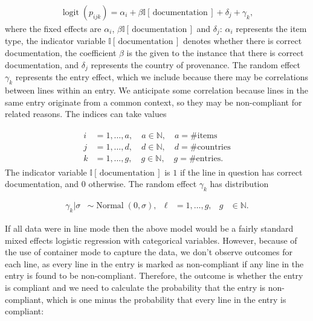 \documentclass[aoas]{imsart}
\DeclareMathOperator{\logit}{logit}
\DeclareMathOperator{\Normal}{Normal}
\begin{document}
\begin{align}
\logit(p_{ijk}) = \alpha_{i} + \beta\mathbb{I}[\,\text{documentation}\,] + \delta_j + \gamma_k \label{eq:logit_model_sim},
\end{align}
where the fixed effects are $\alpha_i$, $\beta\mathbb{I}[\,\text{documentation}\,]$ and $\delta_j$: $\alpha_i$ represents the item type, the indicator variable $\mathbb{I}[\,\text{documentation}\,]$ denotes whether there is correct documentation, the coefficient $\beta$ is the given to the instance that there is correct documentation, and $\delta_j$ represents the country of provenance. The random effect $\gamma_k$ represents the entry effect, which we include because there may be correlations between lines within an entry.  {We anticipate some correlation because lines in the same entry originate from a common context, so they may be non-compliant for related reasons}. The indices can take values

\begin{align}
\begin{split}
i &=1, \ldots, a,\quad  a\in \mathbb{N},\quad a = \text{\# items}\\
j &= 1,\ldots, d, \quad d \in \mathbb{N},\quad d = \text{\# countries}\\
k &= 1,\ldots,g, \quad g\in \mathbb{N},\quad g = \text{\# entries}.
\end{split}
\end{align}
The indicator variable $\mathbb{I}[\,\text{documentation}\,]$ is $1$ if the line in question has correct documentation, and $0$ otherwise. The random effect $\gamma_k$ has distribution

\begin{align}
\gamma_k | \sigma &\sim \Normal(0, \sigma), & \ell &= 1,\ldots, g, & g&\in \mathbb{N}.
\label{eq:entry_effect}
\end{align}

If all data were in line mode then the above model would be a fairly standard mixed effects logistic regression with categorical variables. However, because of the use of container mode to capture the data, we don't observe outcomes for each line, as every line in the entry is marked as non-compliant if any line in the entry is found to be non-compliant. Therefore, the outcome is whether the entry is compliant and we need to calculate the probability that the entry is non-compliant, which is one minus the probability that every line in the entry is compliant:
\end{document}
